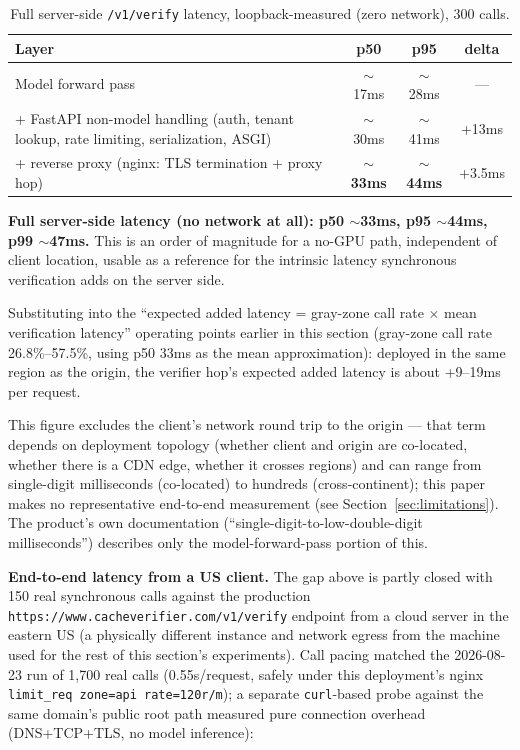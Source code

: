 \documentclass[11pt]{article}
\newenvironment{fittab}{\begin{lrbox}{\fittabbox}}{\end{lrbox}%
  \ifdim\wd\fittabbox>\linewidth\resizebox{\linewidth}{!}{\usebox{\fittabbox}}\else\usebox{\fittabbox}\fi}
\begin{document}
\begin{table}[h]
\centering
\small
\begin{fittab}\begin{tabular}{@{}p{7.2cm}ccc@{}}
\toprule
\textbf{Layer} & \textbf{p50} & \textbf{p95} & \textbf{delta} \\
\midrule
Model forward pass & $\sim$17ms & $\sim$28ms & --- \\
+ FastAPI non-model handling (auth, tenant lookup, rate limiting, serialization, ASGI) & $\sim$30ms & $\sim$41ms & +13ms \\
+ reverse proxy (nginx: TLS termination + proxy hop) & \textbf{$\sim$33ms} & \textbf{$\sim$44ms} & +3.5ms \\
\bottomrule
\end{tabular}\end{fittab}
\caption{Full server-side \texttt{/\allowbreak{}v1/\allowbreak{}verify} latency, loopback-measured (zero network), 300 calls.}
\end{table}

\textbf{Full server-side latency (no network at all): p50 $\sim$33ms, p95 $\sim$44ms, p99 $\sim$47ms.} This is an order of magnitude for a no-GPU path, independent of client location, usable as a reference for the intrinsic latency synchronous verification adds on the server side.

Substituting into the ``expected added latency = gray-zone call rate $\times$ mean verification latency'' operating points earlier in this section (gray-zone call rate 26.8\%--57.5\%, using p50 33ms as the mean approximation): deployed in the same region as the origin, the verifier hop's expected added latency is about +9--19ms per request.

This figure excludes the client's network round trip to the origin --- that term depends on deployment topology (whether client and origin are co-located, whether there is a CDN edge, whether it crosses regions) and can range from single-digit milliseconds (co-located) to hundreds (cross-continent); this paper makes no representative end-to-end measurement (see Section~\ref{sec:limitations}). The product's own documentation (``single-digit-to-low-double-digit milliseconds'') describes only the model-forward-pass portion of this.

\textbf{End-to-end latency from a US client.} The gap above is partly closed with 150 real synchronous calls against the production \texttt{https:\allowbreak{}/\allowbreak{}/\allowbreak{}www.\allowbreak{}cacheverifier.\allowbreak{}com/\allowbreak{}v1/\allowbreak{}verify} endpoint from a cloud server in the eastern US (a physically different instance and network egress from the machine used for the rest of this section's experiments). Call pacing matched the 2026-08-23 run of 1{,}700 real calls (0.55s/request, safely under this deployment's nginx \texttt{limit\_\allowbreak{}req zone=api rate=120r/\allowbreak{}m}); a separate \texttt{curl}-based probe against the same domain's public root path measured pure connection overhead (DNS+TCP+TLS, no model inference):
\end{document}
